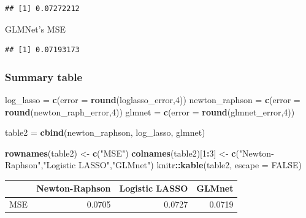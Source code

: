 \documentclass[]{article}
\newenvironment{Shaded}{\begin{snugshade}}{\end{snugshade}}
\newcommand{\DataTypeTok}[1]{\textcolor[rgb]{0.13,0.29,0.53}{#1}}
\newcommand{\DecValTok}[1]{\textcolor[rgb]{0.00,0.00,0.81}{#1}}
\newcommand{\KeywordTok}[1]{\textcolor[rgb]{0.13,0.29,0.53}{\textbf{#1}}}
\newcommand{\NormalTok}[1]{#1}
\newcommand{\OperatorTok}[1]{\textcolor[rgb]{0.81,0.36,0.00}{\textbf{#1}}}
\newcommand{\OtherTok}[1]{\textcolor[rgb]{0.56,0.35,0.01}{#1}}
\newcommand{\StringTok}[1]{\textcolor[rgb]{0.31,0.60,0.02}{#1}}
\begin{document}
\begin{verbatim}
## [1] 0.07272212
\end{verbatim}

GLMNet's MSE

\begin{Shaded}
\end{Shaded}

\begin{verbatim}
## [1] 0.07193173
\end{verbatim}

\hypertarget{summary-table}{%
\subsubsection{Summary table}\label{summary-table}}

\begin{Shaded}
\begin{Highlighting}[]
\NormalTok{log_lasso =}\StringTok{ }\KeywordTok{c}\NormalTok{(}\DataTypeTok{error =} \KeywordTok{round}\NormalTok{(loglasso_error,}\DecValTok{4}\NormalTok{))}
\NormalTok{newton_raphson =}\StringTok{ }\KeywordTok{c}\NormalTok{(}\DataTypeTok{error =} \KeywordTok{round}\NormalTok{(newton_raph_error,}\DecValTok{4}\NormalTok{))}
\NormalTok{glmnet =}\StringTok{ }\KeywordTok{c}\NormalTok{(}\DataTypeTok{error =} \KeywordTok{round}\NormalTok{(glmnet_error,}\DecValTok{4}\NormalTok{))}

\NormalTok{table2 =}\StringTok{ }\KeywordTok{cbind}\NormalTok{(newton_raphson, log_lasso, glmnet)}

\KeywordTok{rownames}\NormalTok{(table2) <-}\StringTok{ }\KeywordTok{c}\NormalTok{(}\StringTok{"MSE"}\NormalTok{)}
\KeywordTok{colnames}\NormalTok{(table2)[}\DecValTok{1}\OperatorTok{:}\DecValTok{3}\NormalTok{] <-}\StringTok{ }\KeywordTok{c}\NormalTok{(}\StringTok{"Newton-Raphson"}\NormalTok{,}\StringTok{"Logistic LASSO"}\NormalTok{,}\StringTok{"GLMnet"}\NormalTok{) }
\NormalTok{knitr}\OperatorTok{::}\KeywordTok{kable}\NormalTok{(table2, }\DataTypeTok{escape =} \OtherTok{FALSE}\NormalTok{)}
\end{Highlighting}
\end{Shaded}

\begin{longtable}[]{@{}lrrr@{}}
\toprule
& Newton-Raphson & Logistic LASSO & GLMnet\tabularnewline
\midrule
\endhead
MSE & 0.0705 & 0.0727 & 0.0719\tabularnewline
\bottomrule
\end{longtable}
\end{document}

